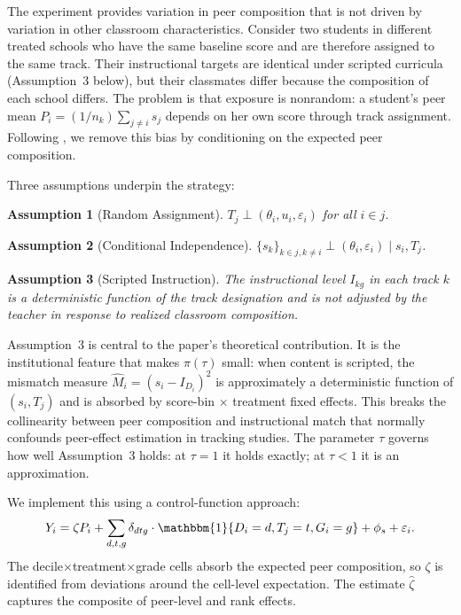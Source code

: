 \documentclass[11pt]{article}
\newtheorem{assumption}{Assumption}
\newcommand{\ind}{\mathbbm{1}}
\begin{document}
The experiment provides variation in peer composition that is not driven by variation in other classroom characteristics. Consider two students in different treated schools who have the same baseline score and are therefore assigned to the same track. Their instructional targets are identical under scripted curricula (Assumption~3 below), but their classmates differ because the composition of each school differs. The problem is that exposure is nonrandom: a student's peer mean $P_i = (1/n_k) \sum_{j \neq i} s_j$ depends on her own score through track assignment. Following \citet{borusyak2023nonrandom}, we remove this bias by conditioning on the expected peer composition.

Three assumptions underpin the strategy:

\begin{assumption}[Random Assignment]
$T_j \perp (\theta_i, u_i, \varepsilon_i)$ for all $i \in j$.
\end{assumption}

\begin{assumption}[Conditional Independence]
$\{s_k\}_{k \in j, k \neq i} \perp (\theta_i, \varepsilon_i) \mid s_i, T_j$.
\end{assumption}

\begin{assumption}[Scripted Instruction]
The instructional level $I_{kg}$ in each track $k$ is a deterministic function of the track designation and is not adjusted by the teacher in response to realized classroom composition.
\end{assumption}

\noindent Assumption~3 is central to the paper's theoretical contribution. It is the institutional feature that makes $\pi(\tau)$ small: when content is scripted, the mismatch measure $\hat{M}_i = (s_i - I_{D_i})^2$ is approximately a deterministic function of $(s_i, T_j)$ and is absorbed by score-bin $\times$ treatment fixed effects. This breaks the collinearity between peer composition and instructional match that normally confounds peer-effect estimation in tracking studies. The parameter $\tau$ governs how well Assumption~3 holds: at $\tau = 1$ it holds exactly; at $\tau < 1$ it is an approximation.

We implement this using a control-function approach:
\begin{equation}
\label{eq:bh}
Y_i = \zeta P_i + \sum_{d,t,g} \delta_{dtg} \cdot \ind\{D_i = d, T_j = t, G_i = g\} + \phi_s + \varepsilon_i.
\end{equation}
The decile$\times$treatment$\times$grade cells absorb the expected peer composition, so $\zeta$ is identified from deviations around the cell-level expectation. The estimate $\hat{\zeta}$ captures the composite of peer-level and rank effects.
\end{document}
